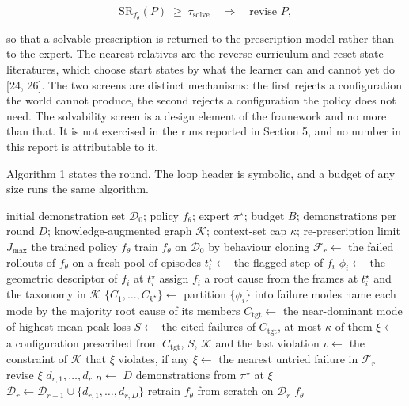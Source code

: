 \documentclass[
  11pt,
]{article}
\begin{document}
\[\mathrm{SR}_{f_\theta}(P) \;\ge\; \tau_{\mathrm{solve}} \quad \Longrightarrow \quad \text{revise } P, \tag{11}\]

so that a solvable prescription is returned to the prescription model
rather than to the expert. The nearest relatives are the
reverse-curriculum and reset-state literatures, which choose start
states by what the learner can and cannot yet do {[}24, 26{]}. The two
screens are distinct mechanisms: the first rejects a configuration the
world cannot produce, the second rejects a configuration the policy does
not need. The solvability screen is a design element of the framework
and no more than that. It is not exercised in the runs reported in
Section 5, and no number in this report is attributable to it.

Algorithm 1 states the round. The loop header is symbolic, and a budget
of any size runs the same algorithm.

\begin{algorithm}[t]
\caption{DISEIL}
\label{alg:diseil}
\begin{algorithmic}[1]
\Require initial demonstration set $\mathcal{D}_0$; policy $f_\theta$; expert $\pi^\star$; budget $B$; demonstrations per round $D$; knowledge-augmented graph $\mathcal{K}$; context-set cap $\kappa$; re-prescription limit $J_{\max}$
\Ensure the trained policy $f_\theta$
\State train $f_\theta$ on $\mathcal{D}_0$ by behaviour cloning
    \State $\mathcal{F}_r \gets$ the failed rollouts of $f_\theta$ on a fresh pool of episodes 
        \State $t^\star_i \gets$ the flagged step of $f_i$ 
        \State $\phi_i \gets$ the geometric descriptor of $f_i$ at $t^\star_i$ 
        \State assign $f_i$ a root cause from the frames at $t^\star_i$ and the taxonomy in $\mathcal{K}$
    \EndFor
    \State $\{C_1,\dots,C_{k^\star}\} \gets$ partition $\{\phi_i\}$ into failure modes 
    \State name each mode by the majority root cause of its members
    \State $C_{\mathrm{tgt}} \gets$ the near-dominant mode of highest mean peak loss 
    \State $S \gets$ the cited failures of $C_{\mathrm{tgt}}$, at most $\kappa$ of them 
    \Repeat
        \State $\xi \gets$ a configuration prescribed from $C_{\mathrm{tgt}}$, $S$, $\mathcal{K}$ and the last violation
        \State $v \gets$ the constraint of $\mathcal{K}$ that $\xi$ violates, if any
     
        \State $\xi \gets$ the nearest untried failure in $\mathcal{F}_r$
    \EndIf
        \State revise $\xi$ 
    \EndIf
    \State $d_{r,1},\dots,d_{r,D} \gets$ $D$ demonstrations from $\pi^\star$ at $\xi$
    \State $\mathcal{D}_r \gets \mathcal{D}_{r-1} \cup \{d_{r,1},\dots,d_{r,D}\}$ 
    \State retrain $f_\theta$ from scratch on $\mathcal{D}_r$ 
\EndFor
\State \Return $f_\theta$
\end{algorithmic}
\end{algorithm}
\end{document}
